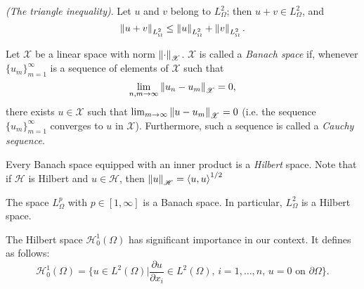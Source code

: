 \begin{corollary}
	\textit{(The triangle inequality)}. Let $u$ and $v$ belong to $L^2_{\Omega}$; then $u+v \in L^2_{\Omega}$, and
	\begin{equation*}
		\left\lVert u+v\right\rVert_{L^2_{\Omega}} \leq \left\lVert u\right\rVert_{L^2_{\Omega}} + \left\lVert v\right\rVert_{L^2_{\Omega}}.
	\end{equation*} 
\end{corollary}
\begin{defn}
	Let $\mathscr{X}$ be a linear space with norm $\left\lVert\cdot\right\rVert_{\mathscr{X}}$. $\mathscr{X}$ is called a \textit{Banach space} if, whenever $\{u_m\}_{m=1}^{\infty}$ is a sequence of elements of $\mathscr{X}$ such that
	\begin{equation*}
		\lim_{n, m\to \infty} \left\lVert u_n - u_m\right\rVert_{\mathscr{X}} = 0,
	\end{equation*}
	there exists $u\in \mathscr{X}$ such that $\lim_{m\to \infty} \left\lVert u - u_m\right\rVert_{\mathscr{X}} = 0$ (i.e. the sequence $\{u_m\}_{m=1}^{\infty}$ converges to $u$ in $\mathscr{X}$). Furthermore, such a sequence is called a \textit{Cauchy sequence}.
\end{defn}
\begin{remark}
	Every Banach space equipped with an inner product is a \textit{Hilbert} space. Note that if $\mathscr{H}$ is Hilbert and $u \in \mathscr{H}$, then $\left\lVert u\right\rVert_{\mathscr{H}} = \mathop{\langle u, u \rangle}^{1/2}$
\end{remark}
\begin{remark}
	The space $L^p_{\Omega}$ with $p \in [1, \infty]$ is a Banach space. In particular,
$L^2_{\Omega}$ is a Hilbert space.
\end{remark}
\begin{remark}
	The Hilbert space $\mathscr{H}_{0}^{1}(\Omega)$ has significant importance in our context. It defines as follows:
	\begin{equation*}
	\mathscr{H}_{0}^{1}(\Omega) = \biggl\{ u\in L^2(\Omega) \vert \frac{\partial u}{\partial x_i} \in L^2(\Omega)\text{, } i=1,\dots,n\text{, } u=0 \text{ on } \partial\Omega \biggr\}.
	\end{equation*}
\end{remark}
